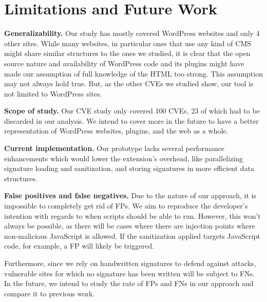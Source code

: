 \section{Limitations and Future Work}

\textbf{Generalizability.} Our study has mostly covered WordPress websites and only 4 other sites. While many websites, in particular ones that use any kind of CMS might share similar structures to the ones we studied, it is clear that the open source nature and availability of WordPress code and its plugins might have made our assumption of full knowledge of the HTML too strong. This assumption may not always hold true. But, as the other CVEs we studied show, our tool is not limited to WordPress sites.

\textbf{Scope of study.} Our CVE study only covered 100 CVEs, 23 of which had to be discarded in our analysis. We intend to cover more in the future to have a better representation of WordPress websites, plugins, and the web as a whole. 

\textbf{Current implementation.} %
Our prototype lacks several performance enhancements which would lower the extension's overhead, like parallelizing signature loading and sanitization, and storing signatures in more efficient data structures.

\textbf{False positives and false negatives.} Due to the nature of our approach, it is impossible to completely get rid of FPs. We aim to reproduce the developer's intention with regards to when scripts should be able to run. However, this won't always be possible, as there will be cases where there are injection points where non-malicious JavaScript is allowed. If the sanitization applied targets JavaScript code, for example, a FP will likely be triggered.

Furthermore, since we rely on handwritten signatures to defend against attacks, vulnerable sites for which no signature has been written will be subject to FNs. In the future, we intend to study the rate of FPs and FNs in our approach and compare it to previous work. 


